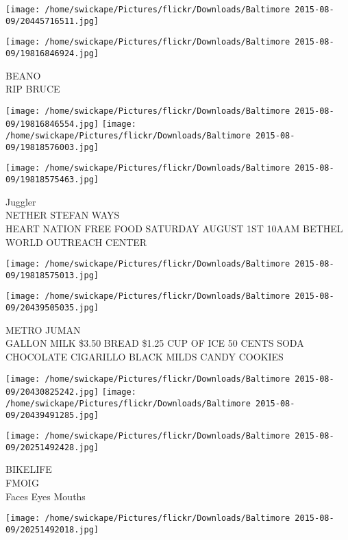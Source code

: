 \documentclass[10pt,letterpaper]{article}
\begin{document}
\texttt{[image: /home/swickape/Pictures/flickr/Downloads/Baltimore 2015-08-09/20445716511.jpg]}

\vspace{0.25in}
\texttt{[image: /home/swickape/Pictures/flickr/Downloads/Baltimore 2015-08-09/19816846924.jpg]}

BEANO\\
RIP BRUCE\\
\pagebreak

\texttt{[image: /home/swickape/Pictures/flickr/Downloads/Baltimore 2015-08-09/19816846554.jpg]}
\texttt{[image: /home/swickape/Pictures/flickr/Downloads/Baltimore 2015-08-09/19818576003.jpg]}

\texttt{[image: /home/swickape/Pictures/flickr/Downloads/Baltimore 2015-08-09/19818575463.jpg]}

Juggler\\
NETHER STEFAN WAYS\\
HEART NATION FREE FOOD SATURDAY AUGUST 1ST 10AAM BETHEL WORLD OUTREACH CENTER\\
\pagebreak

\texttt{[image: /home/swickape/Pictures/flickr/Downloads/Baltimore 2015-08-09/19818575013.jpg]}

\vspace{0.25in}
\texttt{[image: /home/swickape/Pictures/flickr/Downloads/Baltimore 2015-08-09/20439505035.jpg]}

METRO JUMAN\\
GALLON MILK \$3.50 BREAD \$1.25 CUP OF ICE 50 CENTS SODA CHOCOLATE CIGARILLO BLACK MILDS CANDY COOKIES\\
\pagebreak

\texttt{[image: /home/swickape/Pictures/flickr/Downloads/Baltimore 2015-08-09/20430825242.jpg]}
\texttt{[image: /home/swickape/Pictures/flickr/Downloads/Baltimore 2015-08-09/20439491285.jpg]}

\vspace{0.25in}
\texttt{[image: /home/swickape/Pictures/flickr/Downloads/Baltimore 2015-08-09/20251492428.jpg]}

BIKELIFE\\
FMOIG\\
Faces Eyes Mouths\\
\pagebreak

\texttt{[image: /home/swickape/Pictures/flickr/Downloads/Baltimore 2015-08-09/20251492018.jpg]}
\end{document}
